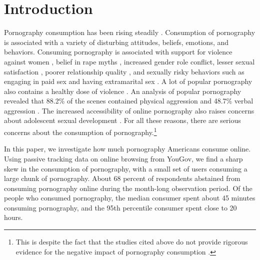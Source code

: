 \documentclass[12pt,twoside]{article}
\begin{document}
\section{Introduction}\label{sec:intro}
Pornography consumption has been rising steadily  \citep{Perry2018-cw, Price2016-sm, Wright2013-gl}. Consumption of pornography is associated with a variety of disturbing attitudes, beliefs, emotions, and behaviors. Consuming pornography is associated with support for violence against women \citep{hald2010pornography, malamuth2012pornography, donnerstein1984pornography}, belief in rape myths \citep{foubert2011pornography}, increased gender role conflict, lesser sexual satisfaction \citep{szymanski2014psychological, stewart2012young}, poorer relationship quality \citep{szymanski2014psychological, szymanski2015male}, and sexually risky behaviors such as engaging in paid sex and having extramarital sex \citep{wright2012internet}. A lot of popular pornography also contains a healthy dose of violence \citep{Vera-Gray2021-qv}. An analysis of popular pornography revealed that 88.2\% of the scenes contained physical aggression and 48.7\% verbal aggression \citep{bridges2010aggression}. The increased accessibility of online pornography also raises concerns about adolescent sexual development \citep{Peter2016-de, Ybarra2005-id}. For all these reasons, there are serious concerns about the consumption of pornography.\footnote{This is despite the fact that the studies cited above do not provide rigorous evidence for the negative impact of pornography consumption \citep{Ferguson2022-fo, Pathmendra2023-fx, Peter2016-de}.}

In this paper, we investigate how much pornography Americans consume online. Using passive tracking data on online browsing from YouGov, we find a sharp skew in the consumption of pornography, with a small set of users consuming a large chunk of pornography. About 68 percent of respondents abstained from consuming pornography online during the month-long observation period. Of the people who consumed pornography, the median consumer spent about 45 minutes consuming pornography, and the 95th percentile consumer spent close to 20 hours. %
\end{document}
